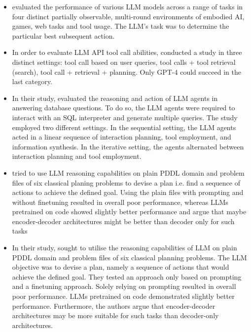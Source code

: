 \documentclass{article}
\begin{document}
\begin{itemize}
	\item \cite{ma_agentboard_2024} evaluated the performance of various LLM models across a range of tasks in four distinct partially observable, multi-round environments of embodied AI, games, web tasks and tool usage. The LLM's task was to determine the particular best subsequent action.
	\item In order to evaluate LLM API tool call abilities, \cite{li_api-bank_2023} conducted a study in three distinct settings: tool call based on user queries, tool calls + tool retrieval (search), tool call + retrieval + planning. Only GPT-4 could succeed in the last category.
	\item In their study, \cite{nan_evaluating_2023} evaluated the reasoning and action of LLM agents in answering database questions. To do so, the LLM agents were required to interact with an SQL interpreter and generate multiple queries. The study employed two different settings. In the sequential setting, the LLM agents acted in a linear sequence of interaction planning, tool employment, and information synthesis. In the iterative setting, the agents alternated between interaction planning and tool employment.
	\item \cite{pallagani_understanding_2023} tried to use LLM reasoning capabilities on plain PDDL domain and problem files of six classical planing problems to devise a plan i.e. find a sequence of actions to achieve the defined goal. Using the plain files with prompting and without finetuning resulted in overall poor performance, whereas LLMs pretrained on code showed slightly better performance and argue that maybe encoder-decoder architectures might be better than decoder only for such tasks
	\item In their study, \cite{pallagani_understanding_2023} sought to utilise the reasoning capabilities of LLM on  plain PDDL domain and problem files of six classical planning problems. The LLM objective was to devise a plan, namely a sequence of actions that would achieve the defined goal. They tested an approach only based on prompting and a finetuning approach. Solely relying on prompting resulted in overall poor performance. LLMs pretrained on code demonstrated slightly better performance. Furthermore, the authors argue that encoder-decoder architectures may be more suitable for such tasks than decoder-only architectures.

\end{itemize}
\end{document}
